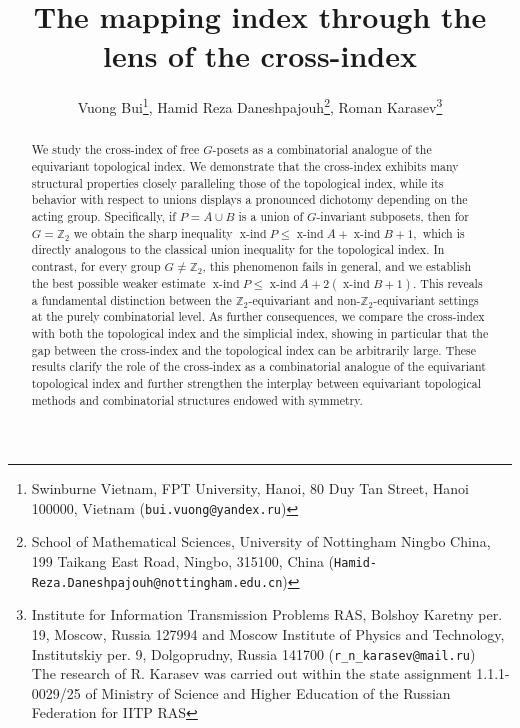 \documentclass[preprint,12pt]{article}
\renewcommand{\le}{\leqslant}
\theoremstyle{definition}
\theoremstyle{remark}
\numberwithin{equation}{section}
\DeclareMathOperator{\xind}{x-ind}
\begin{document}
\title{The mapping index through the lens of the cross-index}

\author{Vuong Bui\thanks{
Swinburne Vietnam, FPT University, Hanoi, 80 Duy Tan Street, Hanoi 100000, Vietnam (\texttt{bui.vuong@yandex.ru})
},\; Hamid Reza Daneshpajouh\thanks{
School of Mathematical Sciences, University of Nottingham Ningbo China, 199 Taikang East Road, Ningbo, 315100, China (\texttt{Hamid-Reza.Daneshpajouh@nottingham.edu.cn})
},\; Roman Karasev\thanks{
Institute for Information Transmission Problems RAS, Bolshoy Karetny per. 19, Moscow, Russia 127994 and Moscow Institute of Physics and Technology, Institutskiy per. 9, Dolgoprudny, Russia 141700 (\texttt{r\_n\_karasev@mail.ru}) \\
The research of R. Karasev was carried out within the state assignment 1.1.1-0029/25 of Ministry of Science and Higher Education of the Russian Federation for IITP RAS
}
}
\date{}
\maketitle


\begin{abstract}
We study the cross-index of free \(G\)-posets as a combinatorial analogue of the equivariant topological index. We demonstrate that the cross-index exhibits many structural properties closely paralleling those of the topological index, while its behavior with respect to unions displays a pronounced dichotomy depending on the acting group. Specifically, if \(P = A \cup B\) is a union of \(G\)-invariant subposets, then for \(G = \mathbb{Z}_2\) we obtain the sharp inequality \(
\xind P \le \xind A + \xind B + 1, \)
which is directly analogous to the classical union inequality for the topological index. In contrast, for every group \(G\neq \mathbb{Z}_2\), this phenomenon fails in general, and we establish the best possible weaker estimate
\(
\xind P \le \xind A + 2(\xind B+1).
\)
This reveals a fundamental distinction between the \(\mathbb{Z}_2\)-equivariant and non-\(\mathbb{Z}_2\)-equivariant settings at the purely combinatorial level. As further consequences, we compare the cross-index with both the topological index and the simplicial index, showing in particular that the gap between the cross-index and the topological index can be arbitrarily large. These results clarify the role of the cross‑index as a combinatorial analogue of the equivariant topological index and further strengthen the interplay between equivariant topological methods and combinatorial structures endowed with symmetry.
\end{abstract}
\end{document}
